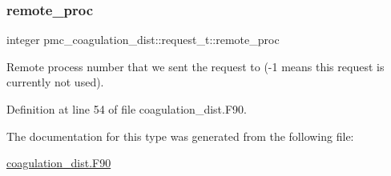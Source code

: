 \subsubsection{\texorpdfstring{remote\+\_\+proc}{remote\_proc}}
{\footnotesize\ttfamily integer pmc\+\_\+coagulation\+\_\+dist\+::request\+\_\+t\+::remote\+\_\+proc}



Remote process number that we sent the request to (-\/1 means this request is currently not used). 



Definition at line 54 of file coagulation\+\_\+dist.\+F90.



The documentation for this type was generated from the following file\+:\begin{DoxyCompactItemize}
\item 
\mbox{\hyperlink{coagulation__dist_8_f90}{coagulation\+\_\+dist.\+F90}}\end{DoxyCompactItemize}
